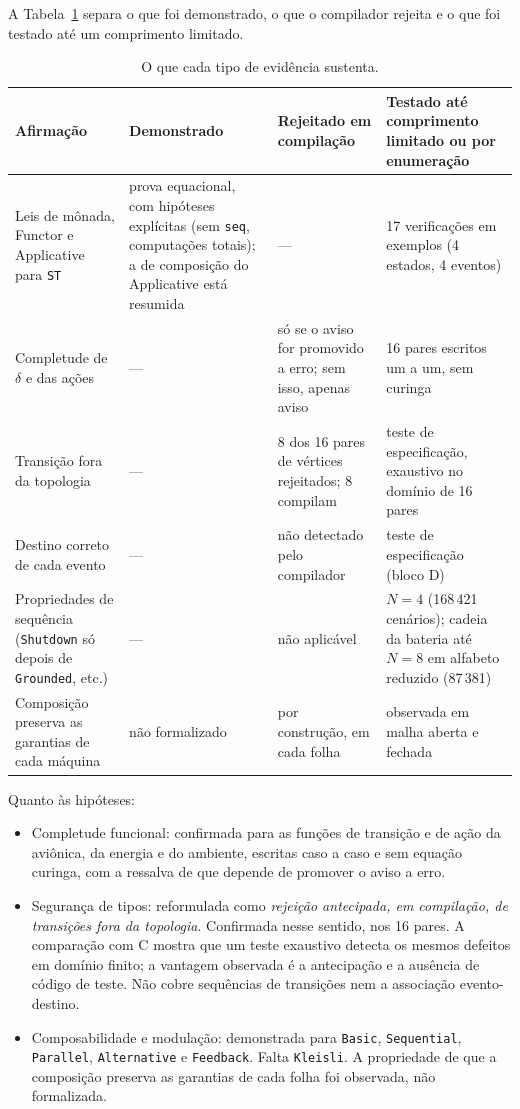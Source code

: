 \documentclass[12pt,a4paper]{article}
\begin{document}
A Tabela~\ref{tab:evidencia} separa o que foi demonstrado, o que o compilador rejeita e o que foi testado até um comprimento limitado.

\begin{table}[h]
\centering
\footnotesize
\begin{tabular}{|p{3.0cm}|p{3.4cm}|p{3.4cm}|p{4.0cm}|}
\hline
Afirmação & Demonstrado & Rejeitado em compilação & Testado até comprimento limitado ou por enumeração \\
\hline
Leis de mônada, Functor e Applicative para \texttt{ST} & prova equacional, com hipóteses explícitas (sem \texttt{seq}, computações totais); a de composição do Applicative está resumida & --- & 17 verificações em exemplos (4 estados, 4 eventos) \\
\hline
Completude de $\delta$ e das ações & --- & só se o aviso for promovido a erro; sem isso, apenas aviso & 16 pares escritos um a um, sem curinga \\
\hline
Transição fora da topologia & --- & 8 dos 16 pares de vértices rejeitados; 8 compilam & teste de especificação, exaustivo no domínio de 16 pares \\
\hline
Destino correto de cada evento & --- & não detectado pelo compilador & teste de especificação (bloco D) \\
\hline
Propriedades de sequência (\texttt{Shutdown} só depois de \texttt{Grounded}, etc.) & --- & não aplicável & $N = 4$ (168\,421 cenários); cadeia da bateria até $N = 8$ em alfabeto reduzido (87\,381) \\
\hline
Composição preserva as garantias de cada máquina & não formalizado & por construção, em cada folha & observada em malha aberta e fechada \\
\hline
\end{tabular}
\caption{O que cada tipo de evidência sustenta.}
\label{tab:evidencia}
\end{table}

Quanto às hipóteses:

\begin{itemize}
\item Completude funcional: confirmada para as funções de transição e de ação da aviônica, da energia e do ambiente, escritas caso a caso e sem equação curinga, com a ressalva de que depende de promover o aviso a erro.
\item Segurança de tipos: reformulada como \textit{rejeição antecipada, em compilação, de transições fora da topologia}. Confirmada nesse sentido, nos 16 pares. A comparação com C mostra que um teste exaustivo detecta os mesmos defeitos em domínio finito; a vantagem observada é a antecipação e a ausência de código de teste. Não cobre sequências de transições nem a associação evento-destino.
\item Composabilidade e modulação: demonstrada para \texttt{Basic}, \texttt{Sequential}, \texttt{Parallel}, \texttt{Alternative} e \texttt{Feedback}. Falta \texttt{Kleisli}. A propriedade de que a composição preserva as garantias de cada folha foi observada, não formalizada.
\end{itemize}
\end{document}

